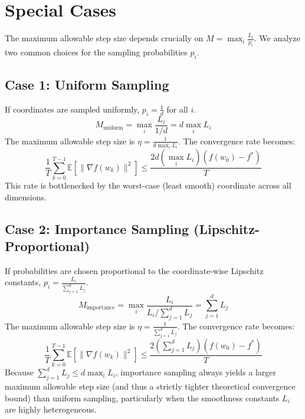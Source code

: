 \documentclass{article}
\begin{document}
\section*{Special Cases}

The maximum allowable step size depends crucially on $M = \max_i \frac{L_i}{p_i}$. We analyze two common choices for the sampling probabilities $p_i$.

\subsection*{Case 1: Uniform Sampling}
If coordinates are sampled uniformly, $p_i = \frac{1}{d}$ for all $i$.
\begin{equation}
    M_{\text{uniform}} = \max_i \frac{L_i}{1/d} = d \max_i L_i
\end{equation}
The maximum allowable step size is $\eta = \frac{1}{d \max_i L_i}$. The convergence rate becomes:
\begin{equation}
    \frac{1}{T} \sum_{k=0}^{T-1} \mathbb{E}[\|\nabla f(w_k)\|^2] \leq \frac{2 d (\max_i L_i) (f(w_0) - f^*)}{T}
\end{equation}
This rate is bottlenecked by the worst-case (least smooth) coordinate across all dimensions.

\subsection*{Case 2: Importance Sampling (Lipschitz-Proportional)}
If probabilities are chosen proportional to the coordinate-wise Lipschitz constants, $p_i = \frac{L_i}{\sum_{j=1}^d L_j}$.
\begin{equation}
    M_{\text{importance}} = \max_i \frac{L_i}{L_i / \sum_{j=1}^d L_j} = \sum_{j=1}^d L_j
\end{equation}
The maximum allowable step size is $\eta = \frac{1}{\sum_{j=1}^d L_j}$. The convergence rate becomes:
\begin{equation}
    \frac{1}{T} \sum_{k=0}^{T-1} \mathbb{E}[\|\nabla f(w_k)\|^2] \leq \frac{2 (\sum_{j=1}^d L_j) (f(w_0) - f^*)}{T}
\end{equation}
Because $\sum_{j=1}^d L_j \leq d \max_i L_i$, importance sampling always yields a larger maximum allowable step size (and thus a strictly tighter theoretical convergence bound) than uniform sampling, particularly when the smoothness constants $L_i$ are highly heterogeneous.
\end{document}
